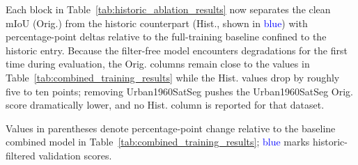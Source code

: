 Each block in Table~\ref{tab:historic_ablation_results} now separates the clean mIoU (Orig.) from the historic counterpart (Hist., shown in \textcolor{blue}{blue}) with percentage-point deltas relative to the full-training baseline confined to the historic entry. Because the filter-free model encounters degradations for the first time during evaluation, the Orig. columns remain close to the values in Table~\ref{tab:combined_training_results} while the Hist. values drop by roughly five to ten points; removing Urban1960SatSeg pushes the Urban1960SatSeg Orig. score dramatically lower, and no Hist. column is reported for that dataset.
\begin{table}[t]
\centering
\caption{Historic-filter ablations. Each row lists the clean score followed by the historic-filter variant (blue) with percentage-point deltas relative to Table~\ref{tab:combined_training_results}; the second row also removes Urban1960SatSeg supervision.}
\label{tab:historic_ablation_results}
\renewcommand{\arraystretch}{1.1}
\renewcommand{\arraystretch}{1}
\end{table}

Values in parentheses denote percentage-point change relative to the baseline combined model in Table~\ref{tab:combined_training_results}; \textcolor{blue}{blue} marks historic-filtered validation scores.